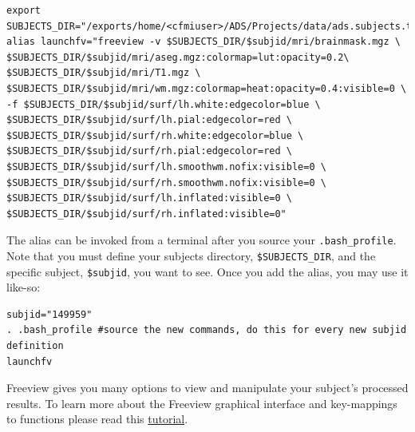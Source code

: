 \documentclass[paper=a4, fontsize=11pt]{scrartcl} %
\numberwithin{equation}{section} %
\numberwithin{figure}{section} %
\numberwithin{table}{section} %
\begin{document}
\begin{lstlisting}
export SUBJECTS_DIR="/exports/home/<cfmiuser>/ADS/Projects/data/ads.subjects.tutorial"
alias launchfv="freeview -v $SUBJECTS_DIR/$subjid/mri/brainmask.mgz \                                                                               
$SUBJECTS_DIR/$subjid/mri/aseg.mgz:colormap=lut:opacity=0.2\                                                                                        
$SUBJECTS_DIR/$subjid/mri/T1.mgz \                                                                                                                  
$SUBJECTS_DIR/$subjid/mri/wm.mgz:colormap=heat:opacity=0.4:visible=0 \                                                                              
-f $SUBJECTS_DIR/$subjid/surf/lh.white:edgecolor=blue \                                                                                             
$SUBJECTS_DIR/$subjid/surf/lh.pial:edgecolor=red \                                                                                                  
$SUBJECTS_DIR/$subjid/surf/rh.white:edgecolor=blue \                                                                                                
$SUBJECTS_DIR/$subjid/surf/rh.pial:edgecolor=red \                                                                                                  
$SUBJECTS_DIR/$subjid/surf/lh.smoothwm.nofix:visible=0 \                                                                                            
$SUBJECTS_DIR/$subjid/surf/rh.smoothwm.nofix:visible=0 \                                                                                            
$SUBJECTS_DIR/$subjid/surf/lh.inflated:visible=0 \                                                                                                  
$SUBJECTS_DIR/$subjid/surf/rh.inflated:visible=0"
\end{lstlisting}

The alias can be invoked from a terminal after you source your \texttt{.bash\_profile}.  Note that you must define your subjects directory, \texttt{\$SUBJECTS\_DIR}, and the specific subject, \texttt{\$subjid}, you want to see. Once you add the alias, you may use it like-so:

\begin{lstlisting}
subjid="149959"
. .bash_profile #source the new commands, do this for every new subjid definition
launchfv
\end{lstlisting}

Freeview gives you many options to view and manipulate your subject's processed results. To learn more about the Freeview graphical interface and key-mappings to functions please read this \href{https://surfer.nmr.mgh.harvard.edu/fswiki/FsTutorial/OutputData_freeview}{tutorial}.
\end{document}
